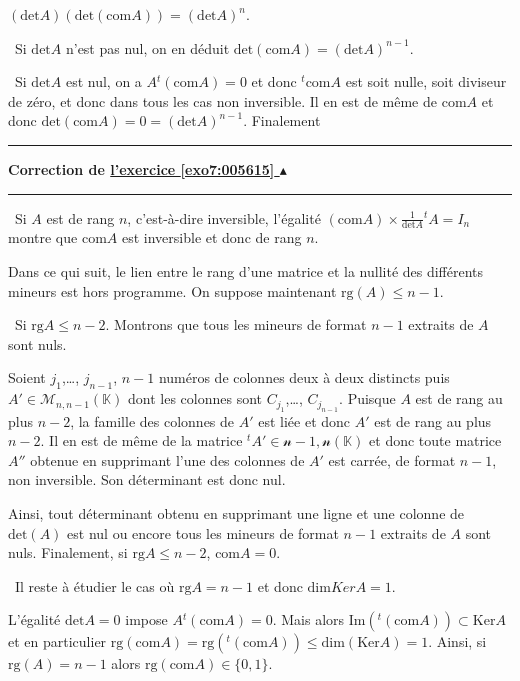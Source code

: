\documentclass[11pt,a4paper]{article}
\newcommand{\Rr}{\mathbb{R}} \newcommand{\R}{\mathbb{R}}
\newcommand{\Kk}{\mathbb{K}} \newcommand{\K}{\mathbb{K}}
\newcounter{exo}
\newcommand{\correction}[1]{\hypertarget{cor7:#1}{}\label{cor7:#1}{\bf Correction de \hyperlink{exo7:#1}{l'exercice \ref{exo7:#1} $\blacktriangle$}}\vspace{1mm}\hrule\vspace{1mm}}
\newcommand{\fincorrection}{\vspace{1mm}\hrule\vspace*{7mm}}
\begin{document}
\begin{center}
$(\text{det}A)(\text{det}(\text{com}A)) = (\text{det}A)^n$.
\end{center}

\textbullet~Si $\text{det}A$ n'est pas nul, on en déduit $\text{det}(\text{com}A)=(\text{det}A)^{n-1}$.

\textbullet~Si $\text{det}A$ est nul, on a $A{^t}(\text{com}A) = 0$ et donc ${^t}\text{com}A$ est soit nulle, soit diviseur de zéro, et donc dans tous les cas non inversible. Il en est de même de $\text{com}A$ et donc $\text{det}(\text{com}A) = 0=(\text{det}A)^{n-1}$. Finalement 

\begin{center}
\shadowbox{
$\forall A\in\mathcal{M}_(\Rr),\;\text{det}(\text{com}A)=(\text{det}A)^{n-1}$.
}
\end{center}
\fincorrection
\correction{005615}
\textbullet~Si $A$ est de rang $n$, c'est-à-dire inversible, l'égalité $(\text{com}A)\times\frac{1}{\text{det}A}{^t}A =I_n$ montre que $\text{com}A$ est inversible et donc de rang $n$.

Dans ce qui suit, le lien entre le rang d'une matrice et la nullité des différents mineurs est hors programme. On suppose maintenant $\text{rg}(A)\leqslant n-1$.

\textbullet~Si $\text{rg}A\leqslant n-2$. Montrons que tous les mineurs de format $n-1$ extraits de $A$ sont nuls.

Soient $j_1$,\ldots, $j_{n-1}$, $n-1$ numéros de colonnes deux à deux distincts puis $A'\in\mathcal{M}_{n,n-1}(\Kk)$ dont les colonnes sont $C_{j_1}$,\ldots, $C_{j_{n-1}}$. Puisque $A$ est de rang au plus $n-2$, la famille des colonnes de $A'$ est liée et donc $A'$ est de rang au plus $n-2$. Il en est de même de la matrice ${^t}A'\in\mathcal{n-1,n}(\Kk)$ et donc toute matrice $A''$ obtenue en supprimant l'une des colonnes de $A'$ est carrée, de format $n-1$, non inversible. Son déterminant est donc nul.

Ainsi, tout déterminant obtenu en supprimant une ligne et une colonne de $\text{det}(A)$ est nul ou encore tous les mineurs de format $n-1$ extraits de $A$ sont nuls. Finalement, si $\text{rg}A\leqslant n-2$, $\text{com}A= 0$.

\textbullet~Il reste à étudier le cas où $\text{rg}A=n-1$ et donc $\text{dim}KerA = 1$.

L'égalité $\text{det}A=0$ impose $A{^t}(\text{com}A) = 0$. Mais alors $\text{Im}({^t}(\text{com}A))\subset\text{Ker}A$ et en particulier $\text{rg}(\text{com}A)=\text{rg}({^t}(\text{com}A))\leqslant\text{dim}(\text{Ker}A)=1$. Ainsi, si $\text{rg}(A)=n-1$ alors $\text{rg}(\text{com}A)\in\{0,1\}$.
\end{document}
